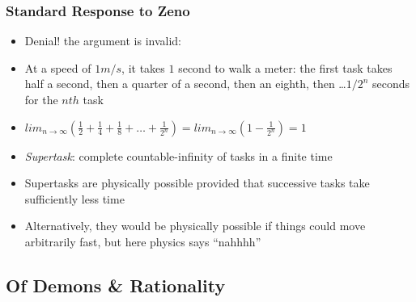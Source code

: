 \begin{frame}
\frametitle{Standard Response to Zeno}

\begin{itemize}[<+->]

\item Denial! the argument is invalid: 

\item At a speed of $1 m/s$, it takes $1$ second to walk a meter: the first task takes half a second, then a quarter of a second, then an eighth, then \dots $1/2^n$ seconds for the $nth$ task

\item $lim_{n \rightarrow \infty} (\frac{1}{2}+\frac{1}{4}+\frac{1}{8}+\dots + \frac{1}{2^n}) = lim_{n \rightarrow \infty} (1 - \frac{1}{2^n}) = 1$

\item \emph{Supertask}: complete countable-infinity of tasks in a finite time

\item Supertasks are physically possible provided that successive tasks take sufficiently less time

\item Alternatively, they would be physically possible if things could move arbitrarily fast, but here physics says ``nahhhh''


\end{itemize}
\end{frame}



\subsection{Of Demons \& Rationality}

